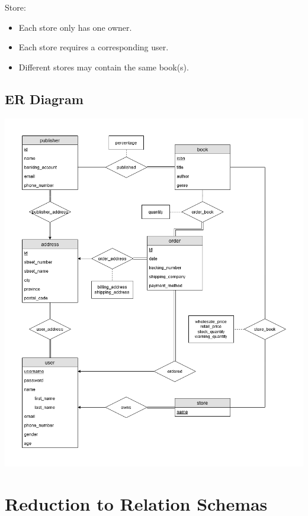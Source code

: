 \documentclass{article}
\begin{document}
        \noindent Store:
        \begin{itemize}
            \item Each store only has one owner.
            \item Each store requires a corresponding user.
            \item Different stores may contain the same book(s).
        \end{itemize}
        
        \subsection{ER Diagram}
    
        \includegraphics[width=16cm]{er-diagram_current.png}

    \section{Reduction to Relation Schemas}
\end{document}
